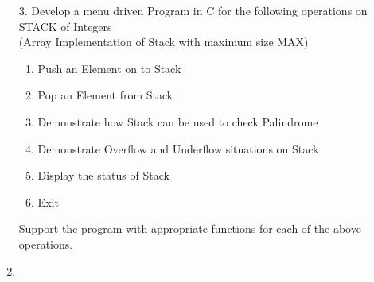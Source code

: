 \documentclass{article}
\newcommand{\answer}{\item [$\rightarrow$]}
\begin{document}
	\begin{enumerate}
		\item [3.] Develop a menu driven Program in C for the following operations on STACK of Integers \\
		(Array Implementation of Stack with maximum size MAX)
		\begin{enumerate}[label=\alph*.]
			\item Push an Element on to Stack
			\item Pop an Element from Stack
			\item Demonstrate how Stack can be used to check Palindrome
			\item Demonstrate Overflow and Underflow situations on Stack
			\item Display the status of Stack
			\item Exit
		\end{enumerate}
		Support the program with appropriate functions for each of the above operations.
		\answer \inputminted{c}{../../Program3.c}
	\end{enumerate}
\end{document}
